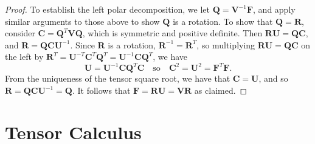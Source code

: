 \documentclass[
  letterpaper,
  DIV=11,
  numbers=noendperiod]{scrreprt}
\theoremstyle{plain}
\theoremstyle{remark}
\begin{document}
\begin{proof}
To establish the left polar decomposition, we let
\({\boldsymbol{Q}}={\boldsymbol{V}}^{-1}{\boldsymbol{F}}\), and apply
similar arguments to those above to show \({\boldsymbol{Q}}\) is a
rotation. To show that \({\boldsymbol{Q}}={\boldsymbol{R}}\), consider
\({\boldsymbol{C}}={\boldsymbol{Q}}^T{\boldsymbol{V}}{\boldsymbol{Q}}\),
which is symmetric and positive definite. Then
\({\boldsymbol{R}}{\boldsymbol{U}}={\boldsymbol{Q}}{\boldsymbol{C}}\),
and
\({\boldsymbol{R}}={\boldsymbol{Q}}{\boldsymbol{C}}{\boldsymbol{U}}^{-1}\).
Since \({\boldsymbol{R}}\) is a rotation,
\({\boldsymbol{R}}^{-1}={\boldsymbol{R}}^T\), so multiplying
\({\boldsymbol{R}}{\boldsymbol{U}}={\boldsymbol{Q}}{\boldsymbol{C}}\) on
the left by
\({\boldsymbol{R}}^T={\boldsymbol{U}}^{-T}{\boldsymbol{C}}^T{\boldsymbol{Q}}^T={\boldsymbol{U}}^{-1}{\boldsymbol{C}}{\boldsymbol{Q}}^T\),
we have
\[{\boldsymbol{U}}= {\boldsymbol{U}}^{-1}{\boldsymbol{C}}{\boldsymbol{Q}}^T{\boldsymbol{C}}\quad\text{so}\quad{\boldsymbol{C}}^2={\boldsymbol{U}}^2={\boldsymbol{F}}^T{\boldsymbol{F}}.\]
From the uniqueness of the tensor square root, we have that
\({\boldsymbol{C}}={\boldsymbol{U}}\), and so
\({\boldsymbol{R}}= {\boldsymbol{Q}}{\boldsymbol{C}}{\boldsymbol{U}}^{-1}={\boldsymbol{Q}}\).
It follows that
\({\boldsymbol{F}}={\boldsymbol{R}}{\boldsymbol{U}}={\boldsymbol{V}}{\boldsymbol{R}}\)
as claimed.
\end{proof}


\chapter{Tensor Calculus}\label{sec-tensor-calculus}

\newcommand{\bfa}{{\boldsymbol{a}}}
\newcommand{\bfb}{{\boldsymbol{b}}}
\newcommand{\bfc}{{\boldsymbol{c}}}
\newcommand{\bfd}{{\boldsymbol{d}}}
\newcommand{\bfe}{{\boldsymbol{e}}}
\newcommand{\bff}{{\boldsymbol{f}}}
\newcommand{\bfg}{{\boldsymbol{g}}}
\newcommand{\bfh}{{\boldsymbol{h}}}
\newcommand{\bfi}{{\boldsymbol{i}}}
\newcommand{\bfj}{{\boldsymbol{j}}}
\newcommand{\bfk}{{\boldsymbol{k}}}
\newcommand{\bfl}{{\boldsymbol{l}}}
\newcommand{\bfm}{{\boldsymbol{m}}}
\newcommand{\bfn}{{\boldsymbol{n}}}
\newcommand{\bfo}{{\boldsymbol{o}}}
\newcommand{\bfp}{{\boldsymbol{p}}}
\newcommand{\bfq}{{\boldsymbol{q}}}
\newcommand{\bfr}{{\boldsymbol{r}}}
\newcommand{\bfs}{{\boldsymbol{s}}}
\newcommand{\bft}{{\boldsymbol{t}}}
\newcommand{\bfu}{{\boldsymbol{u}}}
\newcommand{\bfv}{{\boldsymbol{v}}}
\newcommand{\bfw}{{\boldsymbol{w}}}
\newcommand{\bfx}{{\boldsymbol{x}}}
\newcommand{\bfy}{{\boldsymbol{y}}}
\newcommand{\bfz}{{\boldsymbol{z}}}
\end{document}
